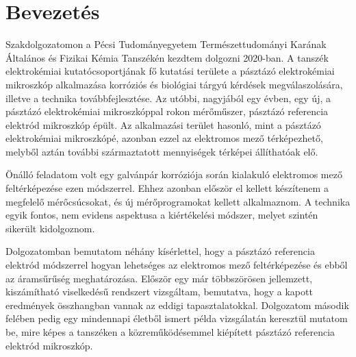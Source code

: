 \chapter{Bevezetés}
\pagestyle{headings}

Szakdolgozatomon a Pécsi Tudományegyetem Természettudományi Karának Általános és Fizikai Kémia Tanszékén kezdtem dolgozni 2020-ban. A tanszék elektrokémiai kutatócsoportjának fő kutatási területe a pásztázó elektrokémiai mikroszkóp alkalmazása korróziós és biológiai tárgyú kérdések megválaszolására, illetve a technika továbbfejlesztése. Az utóbbi, nagyjából egy évben, egy új, a pásztázó elektrokémiai mikroszkóppal rokon mérőműszer, pásztázó referencia elektród mikroszkóp épült. Az alkalmazási terület hasonló, mint a pásztázó elektrokémiai mikroszkópé, azonban ezzel az elektromos mező térképezhető, melyből aztán további származtatott mennyiségek térképei állíthatóak elő. 

Önálló feladatom volt egy galvánpár korróziója során kialakuló elektromos mező feltérképezése ezen módszerrel. Ehhez azonban először el kellett készítenem a megfelelő mérőcsúcsokat, és új mérőprogramokat kellett alkalmaznom. A technika egyik fontos, nem evidens aspektusa a kiértékelési módszer, melyet szintén sikerült kidolgoznom. 

Dolgozatomban bemutatom néhány kísérlettel, hogy a pásztázó referencia elektród módszerrel hogyan lehetséges az elektromos mező feltérképezése és ebből az áramsűrűség meghatározása. Először egy már többszörösen jellemzett, kiszámítható viselkedésű rendszert vizsgáltam, bemutatva, hogy a kapott eredmények összhangban vannak az eddigi tapasztalatokkal. Dolgozatom második felében pedig egy mindennapi életből ismert példa vizsgálatán keresztül mutatom be, mire képes a tanszéken a közreműködésemmel kiépített pásztázó referencia elektród mikroszkóp.
